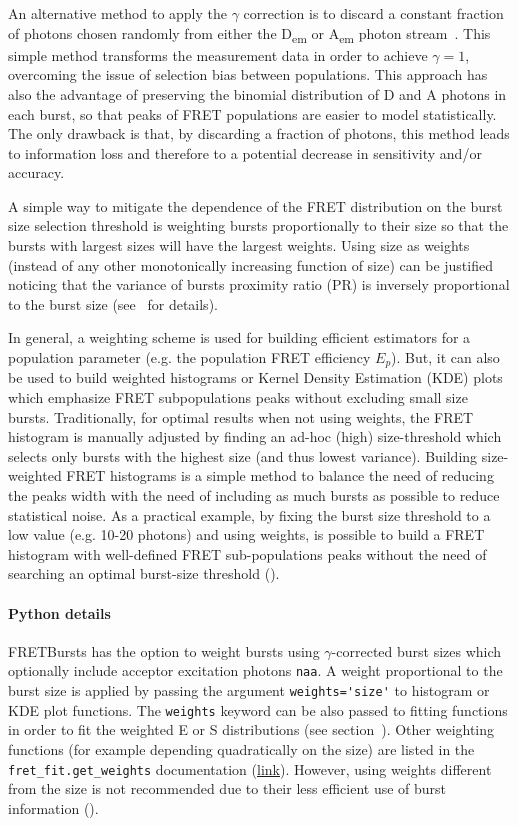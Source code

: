 \documentclass[10pt,letterpaper]{article}
\begin{document}
An alternative method to apply the $\gamma$ correction is to
discard a constant fraction of photons chosen randomly from either 
the D\textsubscript{em} or A\textsubscript{em} photon stream~\cite{Nir_2006}. This 
simple method transforms the measurement data in order to
achieve $\gamma=1$, overcoming the issue of selection bias between populations.
This approach has also the advantage of preserving
the binomial distribution of D and A photons in each burst, so that peaks
of FRET populations are easier to model statistically.
The only drawback is that, by discarding a fraction of photons,
this method leads to information loss and therefore to a potential 
decrease in sensitivity and/or accuracy.

A simple way to mitigate the dependence of the FRET distribution on
the burst size selection threshold is weighting bursts proportionally to their size
so that the bursts with largest sizes will have the largest weights.
Using size as weights (instead of any other monotonically increasing function
of size) can be justified noticing that the variance of bursts proximity ratio (PR) is
inversely proportional to the burst size (see~ for details). %

In general, a weighting scheme is used for building efficient estimators for a population
parameter (e.g. the population FRET efficiency $E_p$).
But, it can also be used to build weighted histograms or Kernel Density
Estimation (KDE) plots which emphasize FRET subpopulations peaks
without excluding small size bursts.
Traditionally, for optimal results when not using weights, the
FRET histogram is manually adjusted by finding an ad-hoc (high)
size-threshold which selects only bursts with the highest size (and thus lowest variance).
Building size-weighted FRET histograms is a simple method to balance
the need of reducing the peaks width with the need of including as much bursts
as possible to reduce statistical noise.
As a practical example, by fixing the burst size threshold to a low value (e.g. 10-20 photons)
and using weights, is possible to build a FRET histogram with well-defined FRET sub-populations peaks
without the need of searching an optimal burst-size threshold ().

\paragraph*{Python details}
FRETBursts has the option to weight bursts using $\gamma$-corrected
burst sizes which optionally include acceptor excitation photons \verb|naa|.
A weight proportional to the burst size is applied by passing the argument
\verb|weights='size'| to histogram or KDE plot functions. The \verb|weights|
keyword can be also passed to fitting functions in order to fit
the weighted E or S distributions (see section~).
Other weighting functions (for example depending quadratically on the size)
are listed in the \verb|fret_fit.get_weights| documentation
(\href{http://fretbursts.readthedocs.org/en/latest/fret_fit.html#fretbursts.fret_fit.get_weights}{link}).
However, using weights different from the size is not recommended
due to their less efficient use of burst information 
().
\end{document}
